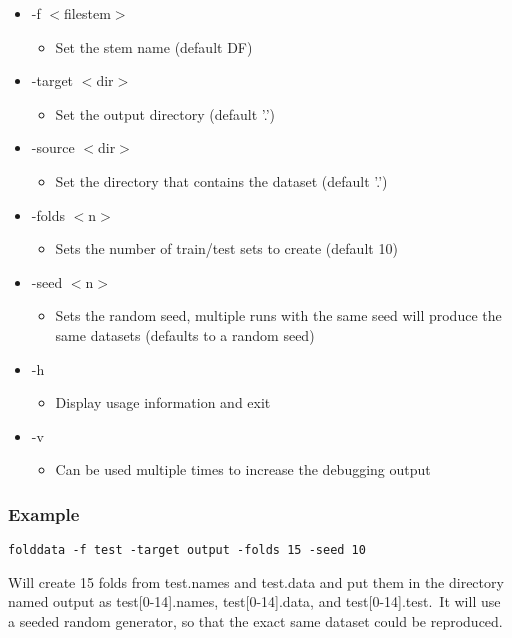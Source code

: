 \begin{itemize}
\item -f $<$filestem$>$\begin{itemize}
\item Set the stem name (default DF)\end{itemize}
\item -target $<$dir$>$\begin{itemize}
\item Set the output directory (default '.')\end{itemize}
\item -source $<$dir$>$\begin{itemize}
\item Set the directory that contains the dataset (default '.')\end{itemize}
\item -folds $<$n$>$\begin{itemize}
\item Sets the number of train/test sets to create (default 10)\end{itemize}
\item -seed $<$n$>$\begin{itemize}
\item Sets the random seed, multiple runs with the same seed will produce the same datasets (defaults to a random seed)\end{itemize}
\item -h\begin{itemize}
\item Display usage information and exit\end{itemize}
\item -v\begin{itemize}
\item Can be used multiple times to increase the debugging output\end{itemize}
\end{itemize}


\subsubsection*{Example}

{\tt folddata -f test -target output -folds 15 -seed 10}

Will create 15 folds from test.names and test.data and put them in the directory named output as test[0-14].names, test[0-14].data, and test[0-14].test.\  It will use a seeded random generator, so that the exact same dataset could be reproduced.

